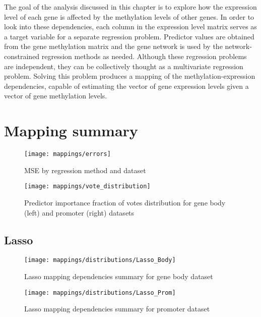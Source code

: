 The goal of the analysis discussed in this chapter is to explore how the expression level of each gene is affected by the methylation levels of other genes. In order to look into these dependencies, each column in the expression level matrix serves as a target variable for a separate regression problem. Predictor values are obtained from the gene methylation matrix and the gene network is used by the network-constrained regression methods as needed. Although these regression problems are independent, they can be collectively thought as a multivariate regression problem. Solving this problem produces a mapping of the methylation-expression dependencies, capable of estimating the vector of gene expression levels given a vector of gene methylation levels.
\pagebreak

\section{Mapping summary}


\begin{figure}[H]
	\centering
	\texttt{[image: mappings/errors]}
	\caption{MSE by regression method and dataset}
	\label{fig:map_errors}
\end{figure}

\pagebreak

\begin{figure}[H]
	\centering
	\texttt{[image: mappings/vote\_distribution]}
	\caption{Predictor importance fraction of votes distribution for gene body (left) and promoter (right) datasets}
	\label{fig:map_vote_dist}
\end{figure}


\pagebreak
\subsection{Lasso}

\begin{figure}[H]
	\centering
	\texttt{[image: mappings/distributions/Lasso\_Body]}
	\caption{Lasso mapping dependencies summary for gene body dataset}
	\label{fig:map_body_lasso}
\end{figure}

\begin{figure}[H]
	\centering
	\texttt{[image: mappings/distributions/Lasso\_Prom]}
	\caption{Lasso mapping dependencies summary for promoter dataset}
	\label{fig:map_prom_lasso}
\end{figure}


